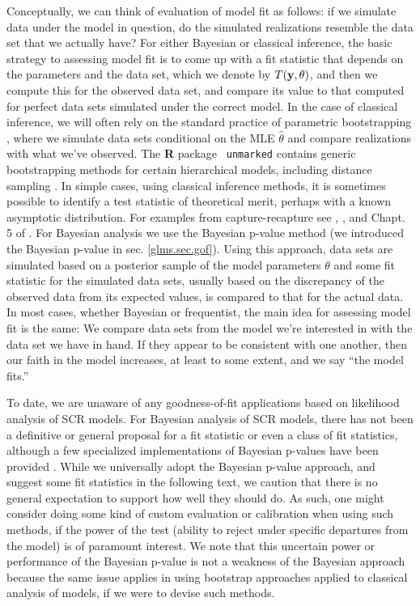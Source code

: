 {Conceptually, we can think of evaluation of model fit as follows: if
we simulate data under the model in question, do the simulated
realizations resemble the data set that we actually have?  For either
Bayesian or classical inference, the basic strategy to assessing model
fit is to come up with a fit statistic that depends on the parameters
and the data set, which we denote by $T({\bf y}, \theta)$, and then we
compute this for the observed data set, and compare its value to that
computed for perfect data sets simulated under the correct model.  In
the case of classical inference, we will often rely on the standard
practice of parametric bootstrapping \citep{dixon:2002}, where we
simulate data sets conditional on the MLE $\hat{\theta}$ and compare
realizations with what we've observed.  The {\bf R} package \mbox{\tt
  unmarked} \citep{fiske_chandler:2011} contains generic bootstrapping
methods for certain hierarchical models, including distance sampling
\citep[e.g., see][for an application]{sillett_etal:2012}.  In simple
cases, using classical inference methods, it is sometimes possible to
identify a test statistic of theoretical merit, perhaps with a known
asymptotic distribution.  For examples from capture-recapture see
\citet{burnham_etal:1987}, \citet{lebreton_etal:1992}, and Chapt. 5 of
  \citet{cooch_white:2006}.  For Bayesian analysis we use the Bayesian
  p-value method \citep{gelman_etal:1996} (we introduced the Bayesian
  p-value in sec. \ref{glms.sec.gof}).  Using this approach, data sets
  are simulated based on a posterior sample of the model parameters
  $\theta$ and some fit statistic for the simulated data sets, usually
  based on the discrepancy of the observed data from its expected
  values, is compared to that for the actual data.  In most cases,
  whether Bayesian or frequentist, the main idea for assessing model
  fit is the same: We compare data sets from the model we're
  interested in with the data set we have in hand. If they appear to
  be consistent with one another, then our faith in the model
  increases, at least to some extent, and we say ``the model fits.''


To date, we are unaware of any goodness-of-fit applications based on
likelihood analysis of SCR models. For 
Bayesian analysis of SCR models, there has not been a definitive or
general proposal for a fit statistic or even a class of fit
statistics, although a few specialized implementations of Bayesian
p-values have been provided \citep{royle:2009,royle_etal:2011mee,
  gopalaswamy_etal:2012mee,gopalaswamy_etal:2012ecol,russell_etal:2012}.
While we universally adopt the Bayesian p-value approach, and suggest
some fit statistics in the following text, we caution that there is
no general expectation to support how well they should do.
As such, one might consider doing some kind of custom
evaluation or calibration when using such methods, if the power of the
test (ability to reject under specific departures from the model) is
of paramount interest.  We note that this uncertain power or
performance of the Bayesian p-value is not a weakness of the Bayesian
approach because the same issue applies in using bootstrap approaches
applied to classical analysis of models, if we were to devise such
methods.



}
